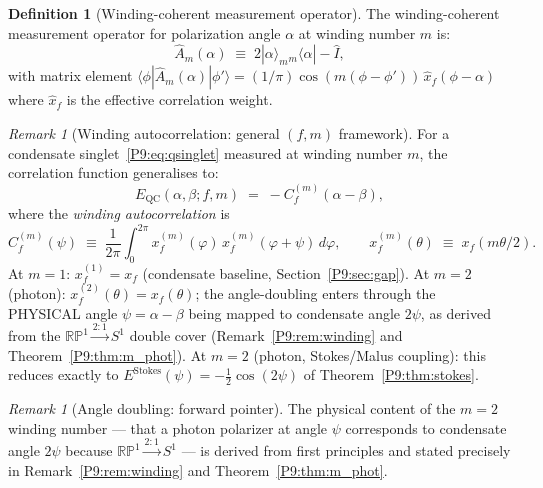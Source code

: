 \documentclass[11pt,a4paper]{article}
\theoremstyle{definition}
\newtheorem{definition}[theorem]{Definition}
\theoremstyle{remark}
\newtheorem{remark}[theorem]{Remark}
\begin{document}
\begin{definition}[Winding-coherent measurement operator]
\label{P9:def:winding_measurement}
The winding-coherent measurement operator for polarization angle $\alpha$
at winding number $m$ is:
\begin{equation}
  \hat{A}_m(\alpha)
  \;\equiv\; 2|\alpha\rangle_m{}_m\langle\alpha| - \hat{I},
  \label{P9:eq:A_winding}
\end{equation}
with matrix element
$\langle\phi|\hat{A}_m(\alpha)|\phi'\rangle
= (1/\pi)\cos(m(\phi-\phi'))\,\hat{x}_f(\phi-\alpha)$
where $\hat{x}_f$ is the effective correlation weight.
\end{definition}
 
\begin{remark}[Winding autocorrelation: general $(f,m)$ framework]
\label{P9:rem:quantum_coherent}
For a condensate singlet~\eqref{P9:eq:qsinglet} measured at winding number $m$,
the correlation function generalises to:
\begin{equation}
  E_\mathrm{QC}(\alpha,\beta;f,m)
  \;=\; -C_f^{(m)}(\alpha-\beta),
  \label{P9:eq:E_QC}
\end{equation}
where the \emph{winding autocorrelation} is
\begin{equation}
  C_f^{(m)}(\psi)
  \;\equiv\; \frac{1}{2\pi}\int_0^{2\pi}
  x_f^{(m)}(\varphi)\,x_f^{(m)}(\varphi+\psi)\,d\varphi,
  \qquad
  x_f^{(m)}(\theta) \;\equiv\; x_f(m\theta/2).
  \label{P9:eq:C_winding}
\end{equation}
At $m=1$: $x_f^{(1)}=x_f$ (condensate baseline, Section~\ref{P9:sec:gap}).
At $m=2$ (photon): $x_f^{(2)}(\theta)=x_f(\theta)$; the angle-doubling enters
through the PHYSICAL angle $\psi=\alpha-\beta$ being mapped to condensate angle $2\psi$,
as derived from the $\mathbb{RP}^1\xrightarrow{2:1}S^1$ double cover
(Remark~\ref{P9:rem:winding} and Theorem~\ref{P9:thm:m_phot}).
At $m=2$ (photon, Stokes/Malus coupling): this reduces exactly to
$E^\mathrm{Stokes}(\psi)=-\tfrac{1}{2}\cos(2\psi)$ of Theorem~\ref{P9:thm:stokes}.
\end{remark}
 
\begin{remark}[Angle doubling: forward pointer]
\label{P9:rem:angle_doubling_pointer}
The physical content of the $m=2$ winding number --- that a photon
polarizer at angle $\psi$ corresponds to condensate angle $2\psi$
because $\mathbb{RP}^1\xrightarrow{2:1}S^1$ --- is derived from first
principles and stated precisely in Remark~\ref{P9:rem:winding}
and Theorem~\ref{P9:thm:m_phot}.
\end{remark}
\end{document}
